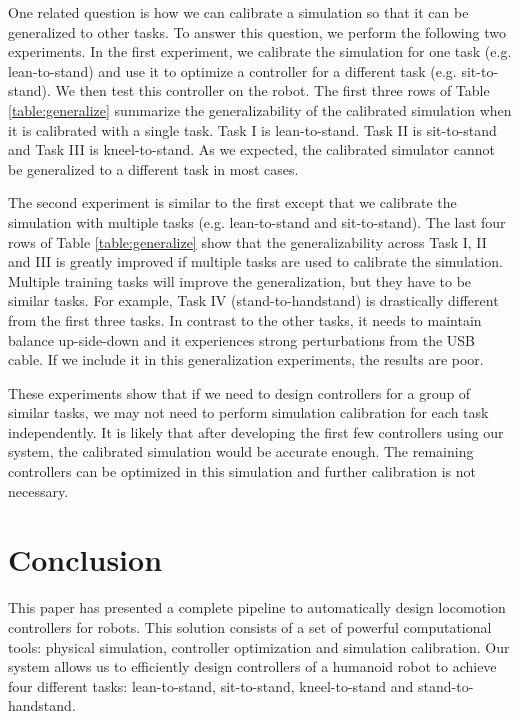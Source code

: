 
One related question is how we can calibrate a simulation so that it can be generalized to other tasks. To answer this question, we perform the following two experiments. In the first experiment, we calibrate the simulation for one task (e.g. lean-to-stand) and use it to optimize a controller for a different task (e.g. sit-to-stand). We then test this controller on the robot. The first three rows of Table \ref{table:generalize} summarize the generalizability of the calibrated simulation when it is calibrated with a single task. Task I is lean-to-stand. Task II is sit-to-stand and Task III is kneel-to-stand. As we expected, the calibrated simulator cannot be generalized to a different task in most cases.

The second experiment is similar to the first except that we calibrate the simulation with multiple tasks (e.g. lean-to-stand and sit-to-stand). The last four rows of Table \ref{table:generalize} show that the generalizability across Task I, II and III is greatly improved if multiple tasks are used to calibrate the simulation. Multiple training tasks will improve the generalization, but they have to be similar tasks. For example, Task IV (stand-to-handstand) is drastically different from the first three tasks. In contrast to the other tasks, it needs to maintain balance up-side-down and it experiences strong perturbations from the USB cable. If we include it in this generalization experiments, the results are poor.

These experiments show that if we need to design controllers for a group of similar tasks, we may not need to perform simulation calibration for each task independently. It is likely that after developing the first few controllers using our system, the calibrated simulation would be accurate enough. The remaining controllers can be optimized in this simulation and further calibration is not necessary.

\section{Conclusion}

This paper has presented a complete pipeline to automatically design locomotion controllers for robots. This solution consists of a set of powerful computational tools: physical simulation, controller optimization and simulation calibration. Our system allows us to efficiently design controllers of a humanoid robot to achieve four different tasks: lean-to-stand, sit-to-stand, kneel-to-stand and stand-to-handstand.

